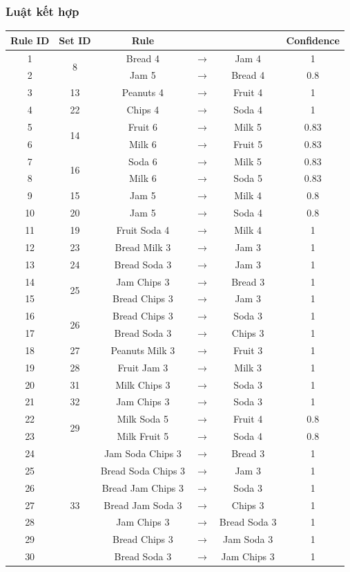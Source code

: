 \documentclass{article}
\begin{document}
\subsubsection{Luật kết hợp}
\begin{longtable}{c | c | c  c  c | c}
	
	
    Rule ID & Set ID & Rule &&& Confidence\\
    \hline
	1 & \multirow{2}{*}{8}&Bread 4 & $\to$ & Jam 4& 1\\ 
	2 & &Jam 5 & $\to$ & Bread 4& 0.8\\ \hline	
	3 & 13&Peanuts 4 & $\to$ & Fruit 4& 1\\ \hline	
	4 & 22&Chips 4 & $\to$ & Soda 4& 1\\ \hline	
	5 & \multirow{2}{*}{14}&Fruit 6 & $\to$ & Milk 5& 0.83\\
	6 & &Milk 6 & $\to$ & Fruit 5& 0.83\\ \hline	
	7 & \multirow{2}{*}{16}&Soda 6 & $\to$ & Milk 5& 0.83\\
	8 & &Milk 6 & $\to$ & Soda 5& 0.83\\ \hline	
	9 & 15&Jam 5 & $\to$ & Milk 4& 0.8\\ \hline	
	10& 20&Jam 5 & $\to$ & Soda 4& 0.8\\ \hline	
	11& 19&Fruit Soda 4 & $\to$ & Milk 4& 1\\ \hline	
	12& 23&Bread Milk 3 & $\to$ & Jam 3& 1\\ \hline	
	13& 24&Bread Soda 3 & $\to$ & Jam 3& 1\\ \hline	
	14& \multirow{2}{*}{25}&Jam Chips 3 & $\to$ & Bread 3& 1\\
	15& &Bread Chips 3 & $\to$ & Jam 3& 1\\	\hline
	16& \multirow{2}{*}{26}&Bread Chips 3 & $\to$ & Soda 3& 1\\
	17& &Bread Soda 3 & $\to$ & Chips 3& 1\\ \hline	
	18& 27&Peanuts Milk 3 & $\to$ & Fruit 3& 1\\ \hline
	19& 28&Fruit Jam 3 & $\to$ & Milk 3& 1\\ \hline	
	20& 31&Milk Chips 3 & $\to$ & Soda 3& 1\\ \hline	
	21& 32&Jam Chips 3 & $\to$ & Soda 3& 1\\ \hline	
	22& \multirow{2}{*}{29}&Milk Soda 5 & $\to$ & Fruit 4& 0.8\\
	23& &Milk Fruit 5 & $\to$ & Soda 4& 0.8\\ \hline	
	24& \multirow{7}{*}{33}&Jam Soda Chips 3 & $\to$ & Bread 3& 1\\
	25& &Bread Soda Chips 3 & $\to$ & Jam 3& 1\\
	26& &Bread Jam Chips 3 & $\to$ & Soda 3& 1\\
	27& &Bread Jam Soda 3 & $\to$ & Chips 3& 1\\
	28& &Jam Chips 3 & $\to$ & Bread Soda 3& 1\\
	29& &Bread Chips 3 & $\to$ & Jam Soda 3& 1\\
	30& &Bread Soda 3 & $\to$ & Jam Chips 3& 1\\
\end{longtable}
\end{document}
